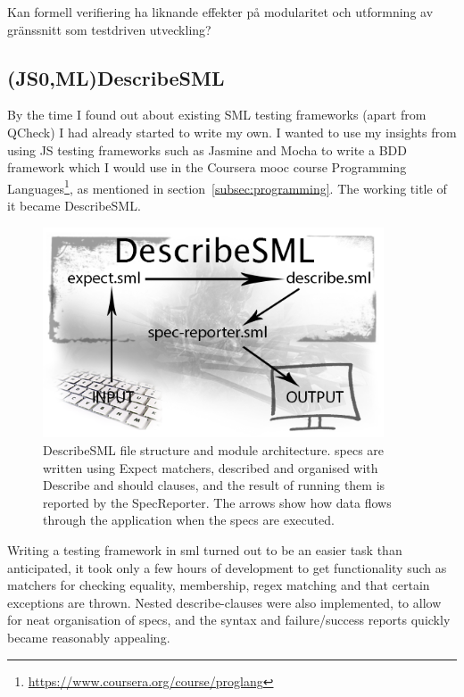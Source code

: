 \documentclass[11pt]{article}
\begin{document}
Kan formell verifiering ha liknande effekter på modularitet och utformning av gränssnitt som testdriven utveckling?


\subsection{(JS0,ML)DescribeSML}
\label{subsec:describesml}

By the time I found out about existing SML testing frameworks (apart from QCheck) I had already started to write my own. I wanted to use my insights from using JS testing frameworks such as Jasmine and Mocha to write a BDD framework which I would use in the Coursera \gls{mooc} course Programming Languages\footnote{\url{https://www.coursera.org/course/proglang}}, as mentioned in section~\ref{subsec:programming}. The working title of it became DescribeSML.

\begin{figure}[ht!]
\centering
\includegraphics[width=0.9\textwidth]{pics/DescribeSML.png}
\caption{DescribeSML file structure and module architecture. \Glspl{spec} are written using Expect \glspl{matcher}, described and organised with Describe and should clauses, and the result of running them is reported by the SpecReporter. The arrows show how data flows through the application when the \glspl{spec} are executed.}
\label{fig:describesml}
\end{figure}

Writing a testing framework in \gls{sml} turned out to be an easier task than anticipated, it took only a few hours of development to get functionality such as \glspl{matcher} for checking equality, membership, regex matching and that certain exceptions are thrown. Nested describe-clauses were also implemented, to allow for neat organisation of \glspl{spec}, and the syntax and failure/success reports quickly became reasonably appealing.
\end{document}
